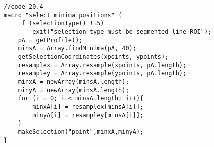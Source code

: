 \begin{lstlisting}[morekeywords={*, getProfile, Array, findMinima, resample, print, getStatistics}]
//code 20.4
macro "select minima positions" {
	if (selectionType() !=5) 
		exit("selection type must be segmented line ROI");
	pA = getProfile();
	minsA = Array.findMinima(pA, 40);
	getSelectionCoordinates(xpoints, ypoints);
	resamplex = Array.resample(xpoints, pA.length);
	resampley = Array.resample(ypoints, pA.length);
	minxA = newArray(minsA.length);
	minyA = newArray(minsA.length);	
	for (i = 0; i < minsA.length; i++){
		minxA[i] = resamplex[minsA[i]];
		minyA[i] = resampley[minsA[i]];
	}
	makeSelection("point",minxA,minyA);
}

\end{lstlisting}